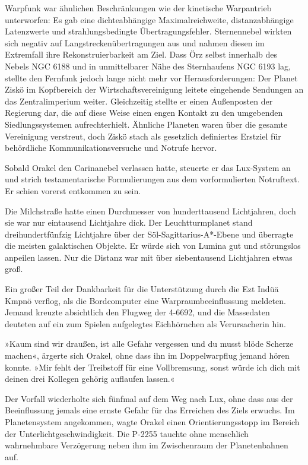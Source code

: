 Warpfunk war ähnlichen Beschränkungen wie der kinetische Warpantrieb unterworfen: Es gab eine dichteabhängige Maximalreichweite, distanzabhängige Latenzwerte und strahlungsbedingte Übertragungsfehler. Sternennebel wirkten sich negativ auf Langstreckenübertragungen aus und nahmen diesen im Extremfall ihre Rekonstruierbarkeit am Ziel. Dass Örz selbst innerhalb des Nebels NGC 6188 und in unmittelbarer Nähe des Sternhaufens NGC 6193 lag, stellte den Fernfunk jedoch lange nicht mehr vor Herausforderungen: Der Planet Ziskö im Kopfbereich der Wirtschaftsvereinigung leitete eingehende Sendungen an das Zentralimperium weiter. Gleichzeitig stellte er einen Außenposten der Regierung dar, die auf diese Weise einen engen Kontakt zu den umgebenden Siedlungssystemen aufrechterhielt. Ähnliche Planeten waren über die gesamte Vereinigung verstreut, doch Ziskö stach als gesetzlich definiertes Erstziel für behördliche Kommunikationsversuche und Notrufe hervor.

Sobald Orakel den Carinanebel verlassen hatte, steuerte er das Lux-System an und strich testamentarische Formulierungen aus dem vorformulierten Notruftext. Er schien vorerst entkommen zu sein.

Die Milchstraße hatte einen Durchmesser von hunderttausend Lichtjahren, doch sie war nur eintausend Lichtjahre dick. Der Leuchtturmplanet stand dreihundertfünfzig Lichtjahre über der Söl-Sagittarius-A*-Ebene und überragte die meisten galaktischen Objekte. Er würde sich von Lumina gut und störungslos anpeilen lassen. Nur die Distanz war mit über siebentausend Lichtjahren etwas groß.

Ein großer Teil der Dankbarkeit für die Unterstützung durch die Ezt Indüä Kmpnö verflog, als die Bordcomputer eine Warpraumbeeinflussung meldeten. Jemand kreuzte absichtlich den Flugweg der 4-6692, und die Massedaten deuteten auf ein zum Spielen aufgelegtes Eichhörnchen als Verursacherin hin.

»Kaum sind wir draußen, ist alle Gefahr vergessen und du musst blöde Scherze machen«, ärgerte sich Orakel, ohne dass ihn im Doppelwarpflug jemand hören konnte. »Mir fehlt der Treibstoff für eine Vollbremsung, sonst würde ich dich mit deinen drei Kollegen gehörig auflaufen lassen.«

Der Vorfall wiederholte sich fünfmal auf dem Weg nach Lux, ohne dass aus der Beeinflussung jemals eine ernste Gefahr für das Erreichen des Ziels erwuchs. Im Planetensystem angekommen, wagte Orakel einen Orientierungsstopp im Bereich der Unterlichtgeschwindigkeit. Die P-2255 tauchte ohne menschlich wahrnehmbare Verzögerung neben ihm im Zwischenraum der Planetenbahnen auf.

